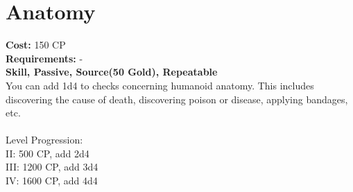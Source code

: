 \section{Anatomy}
\textbf{Cost:} 150 CP\\
\textbf{Requirements:} -\\
\textbf{Skill, Passive, Source(50 Gold), Repeatable}\\
You can add 1d4 to checks concerning humanoid anatomy. This includes discovering the cause of death, discovering poison or disease, applying bandages, etc.\\
\\
Level Progression:\\
II: 500 CP, add 2d4\\
III: 1200 CP, add 3d4\\
IV: 1600 CP, add 4d4\\